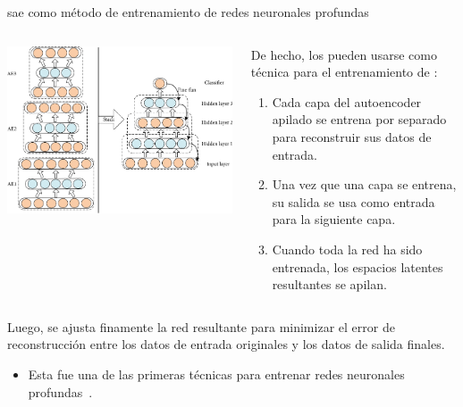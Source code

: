 \begin{frame}{\acrshort{sae} como método de entrenamiento de redes neuronales profundas}

\begin{columns}
    \begin{column}{.4\linewidth}
        \begin{center}
        \includegraphics[width=\textwidth]{Slides/figures/02_Metodos_Generativos/nn-stack-autoencoder-2.png}
        \end{center}
    \end{column}
    \begin{column}{.6\linewidth}
        De hecho, los  pueden usarse como técnica para el entrenamiento de :

        \begin{enumerate}
            \item Cada capa del autoencoder apilado se entrena por separado para reconstruir sus datos de entrada.
            \item Una vez que una capa se entrena, su salida se usa como entrada para la siguiente capa.
            \item Cuando toda la red ha sido entrenada, los espacios latentes resultantes se apilan.
        \end{enumerate}
    \end{column}
\end{columns}
\vspace{1em}
Luego, se ajusta finamente la red resultante para minimizar el error de reconstrucción entre los datos de entrada originales y los datos de salida finales.

\begin{itemize}
    \item Esta fue una de las primeras técnicas para entrenar redes neuronales profundas~\cite{hinton2006reducing}.
\end{itemize}
\end{frame}

